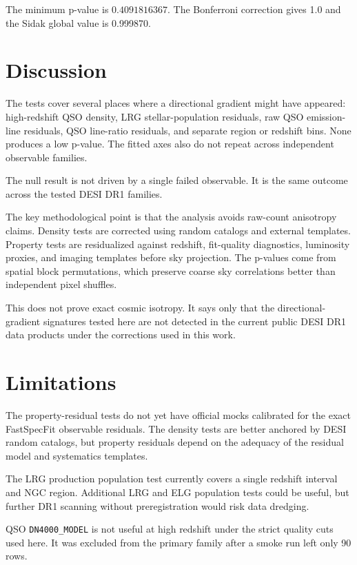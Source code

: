 \documentclass[11pt]{article}
\begin{document}
The minimum p-value is $0.4091816367$. The Bonferroni correction gives 1.0 and the Sidak global value is 0.999870.

\section{Discussion}

The tests cover several places where a directional gradient might have appeared: high-redshift QSO density, LRG stellar-population residuals, raw QSO emission-line residuals, QSO line-ratio residuals, and separate region or redshift bins. None produces a low p-value. The fitted axes also do not repeat across independent observable families.

The null result is not driven by a single failed observable. It is the same outcome across the tested DESI DR1 families.

The key methodological point is that the analysis avoids raw-count anisotropy claims. Density tests are corrected using random catalogs and external templates. Property tests are residualized against redshift, fit-quality diagnostics, luminosity proxies, and imaging templates before sky projection. The p-values come from spatial block permutations, which preserve coarse sky correlations better than independent pixel shuffles.

This does not prove exact cosmic isotropy. It says only that the directional-gradient signatures tested here are not detected in the current public DESI DR1 data products under the corrections used in this work.

\section{Limitations}

The property-residual tests do not yet have official mocks calibrated for the exact FastSpecFit observable residuals. The density tests are better anchored by DESI random catalogs, but property residuals depend on the adequacy of the residual model and systematics templates.

The LRG production population test currently covers a single redshift interval and NGC region. Additional LRG and ELG population tests could be useful, but further DR1 scanning without preregistration would risk data dredging.

QSO \texttt{DN4000\_MODEL} is not useful at high redshift under the strict quality cuts used here. It was excluded from the primary family after a smoke run left only 90 rows.
\end{document}
